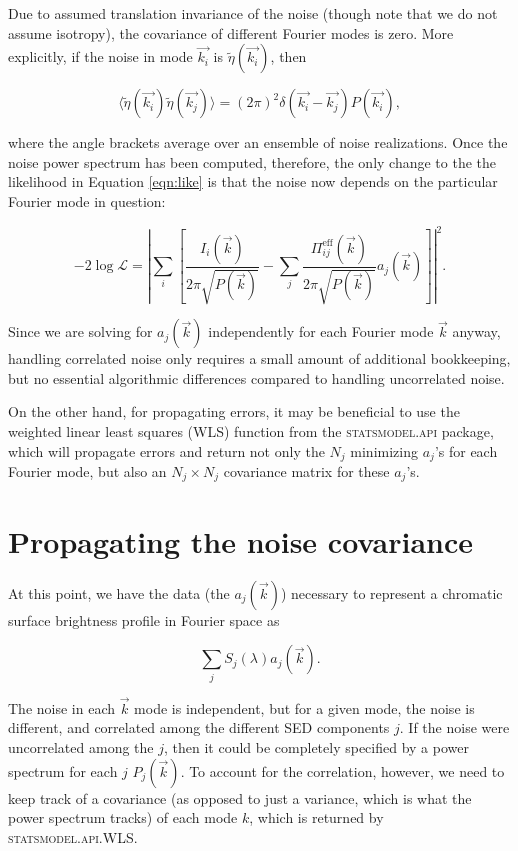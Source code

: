 \documentclass{article}
\begin{document}
Due to assumed translation invariance of the noise (though note that we do not assume isotropy), the
covariance of different Fourier modes is zero.  More explicitly, if the noise in mode $\vec{k_i}$ is
$\tilde\eta(\vec{k_i})$, then

\begin{equation}
  \langle\tilde\eta(\vec{k_i})\tilde\eta(\vec{k_j})\rangle = (2 \pi)^2 \delta(\vec{k_i} - \vec{k_j})P(\vec{k_i}),
\end{equation}

where the angle brackets average over an ensemble of noise realizations.  Once the noise power
spectrum has been computed, therefore, the only change to the the likelihood in Equation
\ref{eqn:like} is that the noise now depends on the particular Fourier mode in question:

\begin{equation}
  \label{eqn:likecorr}
  -2 \log \mathcal{L} = \left|\sum_i\left[\frac{I_i(\vec{k})}{2\pi\sqrt{P(\vec{k})}} - \sum_j \frac{\Pi^\mathrm{eff}_{ij}(\vec{k})}{2\pi\sqrt{P(\vec{k})}} a_j(\vec{k})\right]\right|^2.
\end{equation}

Since we are solving for $a_j(\vec{k})$ independently for each Fourier mode $\vec{k}$ anyway,
handling correlated noise only requires a small amount of additional bookkeeping, but no essential
algorithmic differences compared to handling uncorrelated noise.

On the other hand, for propagating errors, it may be beneficial to use the weighted linear least
squares (\textsc{WLS}) function from the \textsc{statsmodel.api} package, which will propagate
errors and return not only the $N_j$ minimizing $a_j$'s for each Fourier mode, but also an $N_j
\times N_j$ covariance matrix for these $a_j$'s.

\section{Propagating the noise covariance}

At this point, we have the data (the $a_j(\vec{k})$) necessary to represent a chromatic surface
brightness profile in Fourier space as

\begin{equation}
  \sum_j S_j(\lambda) a_j(\vec{k}).
\end{equation}

The noise in each $\vec{k}$ mode is independent, but for a given mode, the noise is different, and
correlated among the different SED components $j$.  If the noise were uncorrelated among the $j$,
then it could be completely specified by a power spectrum for each $j$ $P_j(\vec{k})$.  To account
for the correlation, however, we need to keep track of a covariance (as opposed to just a variance,
which is what the power spectrum tracks) of each mode $k$, which is returned by
\textsc{statsmodel.api.WLS}.
\end{document}
